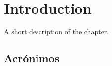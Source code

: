 \chapter{Introduction}%
\label{chapter:introduction}

\begin{introduction}
A short description of the chapter.
\end{introduction}

\section{Acrónimos}
